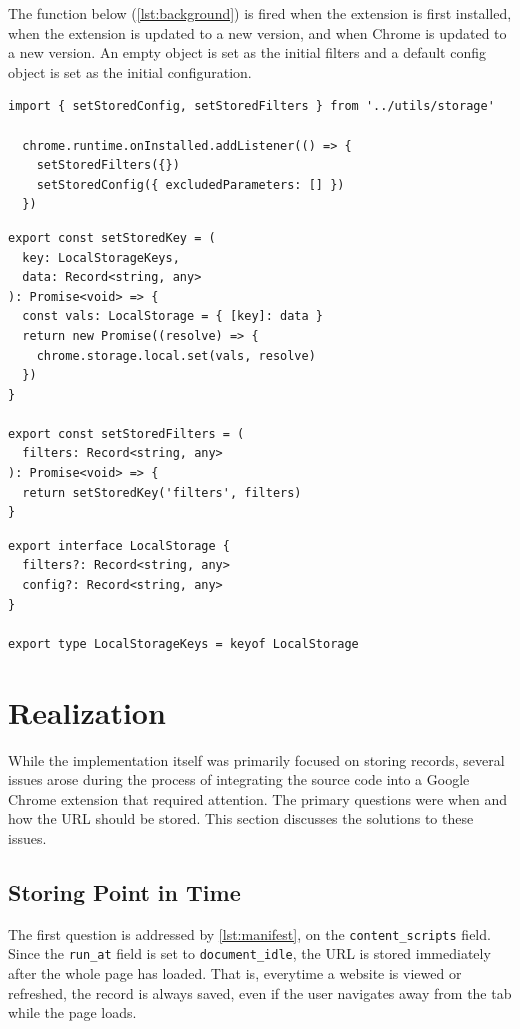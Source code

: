 The function below (\autoref{lst:background}) is fired when the extension is first installed, when the extension is updated to a new version, and when Chrome is updated to a new version. An empty object is set as the initial filters and a default config object is set as the initial configuration.

\begin{lstlisting}[style=ES6, caption={On install functions (TypeScript)}, label={lst:background}]
  import { setStoredConfig, setStoredFilters } from '../utils/storage'

  chrome.runtime.onInstalled.addListener(() => {
    setStoredFilters({})
    setStoredConfig({ excludedParameters: [] })
  })
\end{lstlisting}

\begin{lstlisting}[style=ES6, caption={Helper functions for Chrome Storage API (TypeScript)}]
export const setStoredKey = (
  key: LocalStorageKeys,
  data: Record<string, any>
): Promise<void> => {
  const vals: LocalStorage = { [key]: data }
  return new Promise((resolve) => {
    chrome.storage.local.set(vals, resolve)
  })
}

export const setStoredFilters = (
  filters: Record<string, any>
): Promise<void> => {
  return setStoredKey('filters', filters)
}
\end{lstlisting}

\begin{lstlisting}[style=ES6, caption={TypeScript interface of a LocalStorage object (TypeScript)}]
export interface LocalStorage {
  filters?: Record<string, any>
  config?: Record<string, any>
}

export type LocalStorageKeys = keyof LocalStorage
\end{lstlisting}

\section{Realization}
While the implementation itself was primarily focused on storing records, several issues arose during the process of integrating the source code into a Google Chrome extension that required attention. The primary questions were when and how the URL should be stored. This section discusses the solutions to these issues.

\subsection*{Storing Point in Time}
The first question is addressed by \autoref{lst:manifest}, on the \verb;content_scripts; field. Since the \verb;run_at; field is set to \verb;document_idle;, the URL is stored immediately after the whole page has loaded. That is, everytime a website is viewed or refreshed, the record is always saved, even if the user navigates away from the tab while the page loads.

